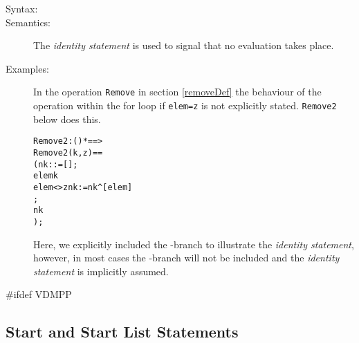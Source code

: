 \documentclass[\pformat,12pt]{article}
\begin{document}
\begin{description}
\item[Syntax:]


\item[Semantics:] The {\it identity statement\/} is used to signal that no
  evaluation takes place.

\item[Examples:] In the operation \texttt{Remove} in section
  \ref{removeDef} the behaviour of the operation within the
  \textsf{for} loop if \texttt{elem=z} is not explicitly
  stated. \texttt{Remove2} below does this.
  \begin{alltt}
  Remove2 : () *  ==> 
  Remove2 (k,z) ==
    ( nk :  := [];
      elem  k 
        elem <> z  nk := nk^[elem]
       ;
      nk
    );
  \end{alltt}
  Here, we explicitly included the -branch to illustrate the
  {\it identity statement}, however, in most cases the -branch
  will not be included and the {\it identity statement\/} is implicitly
  assumed.

\end{description}

#ifdef VDMPP
\subsection{Start and Start List Statements}\label{sec:start}
\label{sc:startstmt}
\end{document}
